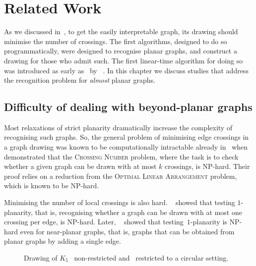 \chapter{Related Work}\label{ch:related-work}

As we discussed in~, to get the easily interpretable graph, its drawing should minimise the number of crossings. The first algorithms, designed to do so programmatically, were designed to recognise planar graphs, and construct a drawing for those who admit such. The first linear-time algorithm for doing so was introduced as early as~\citeyear{linear-p} by \citeauthor{linear-p}~\cite{linear-p}. In this chapter we discuss studies that address the recognition problem for \emph{almost} planar graphs.

\section{Difficulty of dealing with beyond-planar graphs}

Most relaxations of strict planarity dramatically increase the complexity of recognising such graphs. So, the general problem of minimising edge crossings in a graph drawing was known to be computationally intractable already in~\citeyear{cr_NPC} when \citeauthor{cr_NPC}~\cite{cr_NPC} demonstrated that the \textsc{Crossing Number} problem, where the task is to check whether a given graph can be drawn with at most \(k\) crossings, is NP-hard. Their proof relies on a reduction from the \textsc{Optimal Linear Arrangement} problem, which is known to be NP-hard.

Minimising the number of local crossings is also hard. \citeauthor{1p-NPH}~\cite{1p-NPH} showed that testing \(1\)-planarity, that is, recognising whether a graph can be drawn with at most one crossing per edge, is NP-hard. Later, \citeauthor{one-edge-NPH}~\cite{one-edge-NPH} showed that testing~\(1\)-planarity is NP-hard even for near-planar graphs, that is, graphs that can be obtained from planar graphs by adding a single edge.

\begin{figure}[tbh]
    \centering
    \captionsetup{subrefformat=parens}
    \caption{Drawing of \(K_5\) ~non-restricted and ~restricted to a circular setting.}
    \label{fig:figure}
\end{figure}

